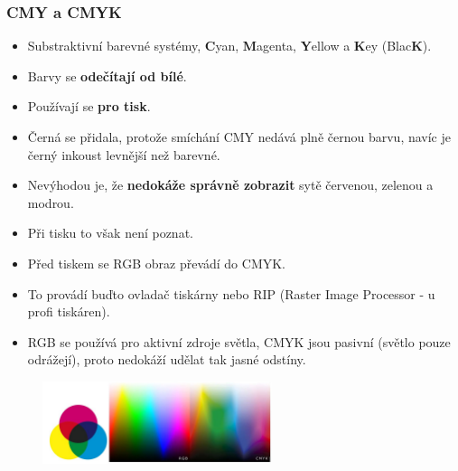 \subsubsection{CMY a CMYK}
\begin{itemize}
	\item Substraktivní barevné systémy, \textbf{C}yan, \textbf{M}agenta, \textbf{Y}ellow a \textbf{K}ey (Blac\textbf{K}). 
	\item Barvy se \textbf{odečítají od bílé}.
	\item Používají se \textbf{pro tisk}.
	\item Černá se přidala, protože smíchání CMY nedává plně černou barvu, navíc je černý inkoust levnější než barevné.
	\item Nevýhodou je, že \textbf{nedokáže správně zobrazit} sytě červenou, zelenou a modrou.
	\item Při tisku to však není poznat.
	\item Před tiskem se RGB obraz převádí do CMYK.
	\item To provádí buďto ovladač tiskárny nebo RIP (Raster Image Processor - u profi tiskáren).
	\item RGB se používá pro aktivní zdroje světla, CMYK jsou pasivní (světlo pouze odrážejí), proto nedokáží udělat tak jasné odstíny.
\end{itemize}
	\begin{figure}[H]
	\centering
	\includegraphics[width=0.6\textwidth]{assets/1_cmyk}
	\end{figure}